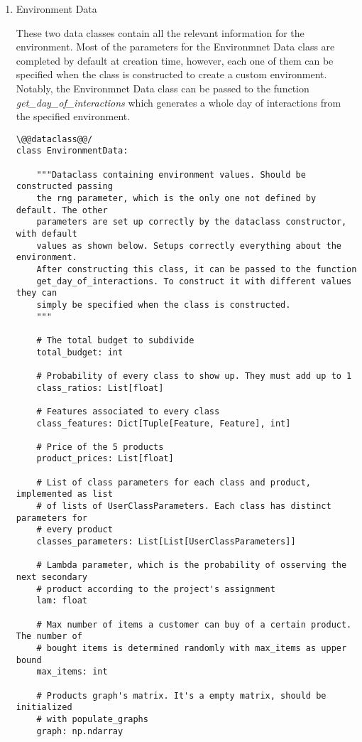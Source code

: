 \begin{enumerate}
    \item Environment Data

    These two data classes contain all the relevant information for the environment. Most of the parameters for the Environmnet Data class are completed by default at creation time, however, each one of them can be specified when the class is constructed to create a custom environment. Notably, the Environmnet Data class can be passed to the function \textit{get\_day\_of\_interactions} which generates a whole day of interactions from the specified environment.

    \begin{lstlisting}[style=Python]
\@@dataclass@@/
class EnvironmentData:

    """Dataclass containing environment values. Should be constructed passing
    the rng parameter, which is the only one not defined by default. The other
    parameters are set up correctly by the dataclass constructor, with default
    values as shown below. Setups correctly everything about the environment.
    After constructing this class, it can be passed to the function
    get_day_of_interactions. To construct it with different values they can
    simply be specified when the class is constructed.
    """

    # The total budget to subdivide
    total_budget: int

    # Probability of every class to show up. They must add up to 1
    class_ratios: List[float]

    # Features associated to every class
    class_features: Dict[Tuple[Feature, Feature], int]

    # Price of the 5 products
    product_prices: List[float]

    # List of class parameters for each class and product, implemented as list
    # of lists of UserClassParameters. Each class has distinct parameters for
    # every product
    classes_parameters: List[List[UserClassParameters]]

    # Lambda parameter, which is the probability of osserving the next secondary
    # product according to the project's assignment
    lam: float

    # Max number of items a customer can buy of a certain product. The number of
    # bought items is determined randomly with max_items as upper bound
    max_items: int

    # Products graph's matrix. It's a empty matrix, should be initialized
    # with populate_graphs
    graph: np.ndarray


\end{lstlisting}
\end{enumerate}
